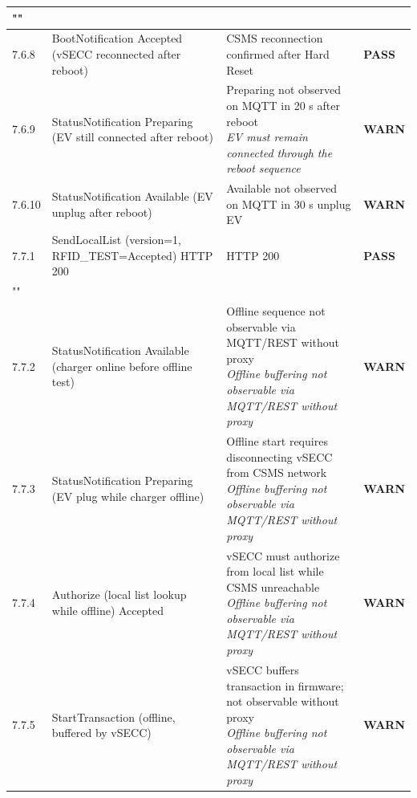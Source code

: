 \documentclass[10pt, a4paper]{article}
\begin{document}
\begin{longtable}{|L{1cm}|L{5.5cm}|M{7cm}|C{1.8cm}|}
\hline
{} \\
\hline
\small 7.6.8 & \small BootNotification  Accepted (vSECC reconnected after reboot) & CSMS reconnection confirmed after Hard Reset & \textcolor{passgreen}{\textbf{PASS}} \\
\hline
\small 7.6.9 & \small StatusNotification Preparing (EV still connected after reboot) & Preparing not observed on MQTT in 20 s after reboot{\newline\normalfont\footnotesize\itshape EV must remain connected through the reboot sequence} & \textcolor{warnorange}{\textbf{WARN}} \\
\hline
\small 7.6.10 & \small StatusNotification Available (EV unplug after reboot) & Available not observed on MQTT in 30 s  unplug EV & \textcolor{warnorange}{\textbf{WARN}} \\
\hline
\small 7.7.1 & \small SendLocalList (version=1, RFID\_TEST=Accepted)  HTTP 200 & HTTP 200 & \textcolor{passgreen}{\textbf{PASS}} \\
\hline
{} \\
\hline
\small 7.7.2 & \small StatusNotification Available (charger online before offline test) & Offline sequence not observable via MQTT/REST without proxy{\newline\normalfont\footnotesize\itshape Offline buffering not observable via MQTT/REST without proxy} & \textcolor{warnorange}{\textbf{WARN}} \\
\hline
\small 7.7.3 & \small StatusNotification Preparing (EV plug while charger offline) & Offline start requires disconnecting vSECC from CSMS network{\newline\normalfont\footnotesize\itshape Offline buffering not observable via MQTT/REST without proxy} & \textcolor{warnorange}{\textbf{WARN}} \\
\hline
\small 7.7.4 & \small Authorize (local list lookup while offline)  Accepted & vSECC must authorize from local list while CSMS unreachable{\newline\normalfont\footnotesize\itshape Offline buffering not observable via MQTT/REST without proxy} & \textcolor{warnorange}{\textbf{WARN}} \\
\hline
\small 7.7.5 & \small StartTransaction (offline, buffered by vSECC) & vSECC buffers transaction in firmware; not observable without proxy{\newline\normalfont\footnotesize\itshape Offline buffering not observable via MQTT/REST without proxy} & \textcolor{warnorange}{\textbf{WARN}} \\

\end{longtable}
\end{document}
